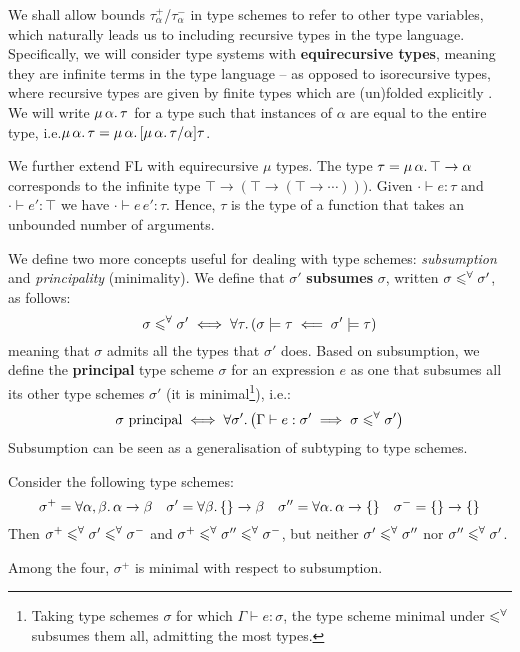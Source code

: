 We shall allow bounds $\tau_\alpha^+$/$\tau_\alpha^-$ in type schemes to refer to other type variables, which naturally leads us to including recursive types in the type language.
Specifically, we will consider type systems with \textbf{equirecursive types}, meaning they are infinite terms in the type language -- as opposed to isorecursive types, where recursive types are given by finite types which are (un)folded explicitly \cite{tapl}. We will write $\mu\,{\alpha}\ldotp \tau$ for a type such that instances of $\alpha$ are equal to the entire type, i.e.\@ $\mu\,{\alpha}\ldotp  \tau = \mu\,{\alpha}\ldotp [\mu\,{\alpha}\ldotp \tau/\alpha] \tau$.
\begin{example}
    We further extend FL with equirecursive $\mu$ types. 
    The type $\tau = \mu\,{\alpha}\ldotp \top \to \alpha$ corresponds to the infinite type $\top \to (\top \to (\top \to \cdots)))$. Given $\cdot \vdash e : \tau$ and $\cdot \vdash e' : \top$ we have $\cdot \vdash e\,e' : \tau$. Hence, $\tau$ is the type of a function that takes an unbounded number of arguments.
\end{example}

We define two more concepts useful for dealing with type schemes: \emph{subsumption} and \emph{principality} (minimality). We define that $\sigma'$ \textbf{subsumes} $\sigma$, written $\sigma \leqslant^\forall \sigma'$, as follows:
$$ \sigma \leqslant^\forall \sigma' \iff \forall \tau \ldotp (\sigma \models \tau \impliedby \sigma' \models \tau) $$
meaning that $\sigma$ admits all the types that $\sigma'$ does.
Based on subsumption, we define the \textbf{principal} type scheme $\sigma$ for an expression $e$ as one that subsumes all its other type schemes $\sigma'$ (it is minimal\footnote{Taking type schemes $\sigma$ for which $\Gamma \vdash e : \sigma$, the type scheme minimal under $\leqslant^\forall$ subsumes them all, admitting the most types.}), i.e.\@:
$$ \sigma\text{ principal} \iff \forall \sigma' \ldotp \left( \Gamma \vdash e : \sigma' \implies \sigma \subsume \sigma' \right) $$
Subsumption can be seen as a generalisation of subtyping to type schemes.
\begin{example}
Consider the following type schemes:
$$    \sigma^+ = \forall \alpha, \beta \ldotp \alpha \to \beta
\quad \sigma' = \forall \beta \ldotp \flrec{} \to \beta 
\quad \sigma'' = \forall \alpha \ldotp \alpha \to \flrec{} 
\quad \sigma^- = \flrec{} \to \flrec{} $$
Then $\sigma^+ \leqslant^\forall \sigma' \leqslant^\forall \sigma^-$ and $\sigma^+ \leqslant^\forall \sigma'' \leqslant^\forall \sigma^-$, but neither $\sigma' \leqslant^\forall \sigma''$ nor $\sigma'' \leqslant^\forall \sigma'$. 

Among the four, $\sigma^+$ is minimal with respect to subsumption.
\end{example}

